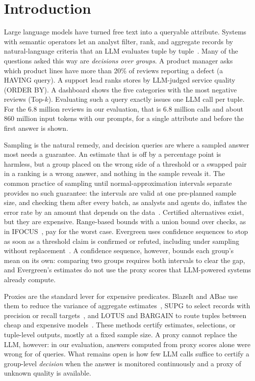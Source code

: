 \section{Introduction}
\label{sec:intro}

Large language models have turned free text into a queryable attribute.
Systems with semantic operators let an analyst filter, rank, and aggregate records by natural-language criteria that an LLM evaluates tuple by tuple~\cite{lotus,docetl,uqe,thalamusdb}.
Many of the questions asked this way are \emph{decisions over groups}.
A product manager asks which product lines have more than 20\% of reviews reporting a defect (a HAVING query).
A support lead ranks stores by LLM-judged service quality (ORDER BY).
A dashboard shows the five categories with the most negative reviews (Top-$k$).
Evaluating such a query exactly issues one LLM call per tuple.
For the 6.8 million reviews in our evaluation, that is 6.8 million calls and about 860 million input tokens with our prompts, for a single attribute and before the first answer is shown.

Sampling is the natural remedy, and decision queries are where a sampled answer most needs a guarantee.
An estimate that is off by a percentage point is harmless, but a group placed on the wrong side of a threshold or a swapped pair in a ranking is a wrong answer, and nothing in the sample reveals it.
The common practice of sampling until normal-approximation intervals separate provides no such guarantee: the intervals are valid at one pre-planned sample size, and checking them after every batch, as analysts and agents do, inflates the error rate by an amount that depends on the data~\cite{johari2022,ramdas2023savi}.
Certified alternatives exist, but they are expensive.
Range-based bounds with a union bound over checks, as in IFOCUS~\cite{ifocus}, pay for the worst case.
Evergreen uses confidence sequences to stop as soon as a threshold claim is confirmed or refuted, including under sampling without replacement~\cite{evergreen,wsr2024betting}.
A confidence sequence, however, bounds each group's mean on its own: comparing two groups requires both intervals to clear the gap, and Evergreen's estimates do not use the proxy scores that LLM-powered systems already compute.

Proxies are the standard lever for expensive predicates.
BlazeIt and ABae use them to reduce the variance of aggregate estimates~\cite{blazeit,abae}, SUPG to select records with precision or recall targets~\cite{supg}, and LOTUS and BARGAIN to route tuples between cheap and expensive models~\cite{lotus,bargain}.
These methods certify estimates, selections, or tuple-level outputs, mostly at a fixed sample size.
A proxy cannot replace the LLM, however: in our evaluation, answers computed from proxy scores alone were wrong for \numNPROXYWRONG{} of \numNPROXYQ{} queries.
What remains open is how few LLM calls suffice to certify a group-level \emph{decision} when the answer is monitored continuously and a proxy of unknown quality is available.

